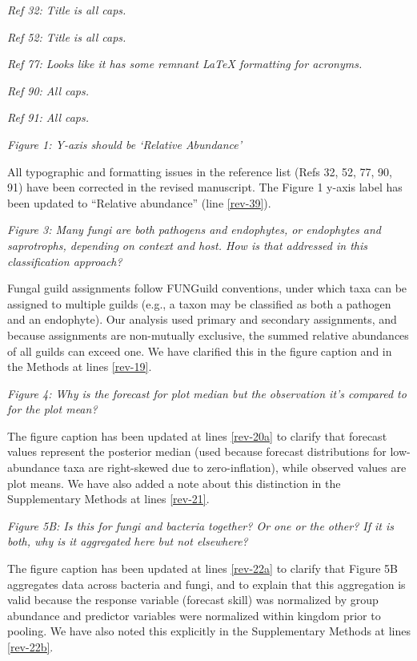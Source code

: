 \documentclass[11pt]{article}
\begin{document}
\bigskip

\textit{Ref 32: Title is all caps.}

\textit{Ref 52: Title is all caps.}

\textit{Ref 77: Looks like it has some remnant LaTeX formatting for acronyms.}

\textit{Ref 90: All caps.}

\textit{Ref 91: All caps.}

\textit{Figure 1: Y-axis should be `Relative Abundance'}

All typographic and formatting issues in the reference list (Refs 32, 52, 77, 90, 91) have been corrected in the revised manuscript. The Figure 1 y-axis label has been updated to ``Relative abundance'' (line \ref{rev-39}).

\bigskip

\textit{Figure 3: Many fungi are both pathogens and endophytes, or endophytes and saprotrophs, depending on context and host. How is that addressed in this classification approach?}

Fungal guild assignments follow FUNGuild conventions, under which taxa can be assigned to multiple guilds (e.g., a taxon may be classified as both a pathogen and an endophyte). Our analysis used primary and secondary assignments, and because assignments are non-mutually exclusive, the summed relative abundances of all guilds can exceed one. We have clarified this in the figure caption and in the Methods at lines \ref{rev-19}.

\bigskip

\textit{Figure 4: Why is the forecast for plot median but the observation it's compared to for the plot mean?}

The figure caption has been updated at lines \ref{rev-20a} to clarify that forecast values represent the posterior median (used because forecast distributions for low-abundance taxa are right-skewed due to zero-inflation), while observed values are plot means. We have also added a note about this distinction in the Supplementary Methods at lines \ref{rev-21}.

\bigskip

\textit{Figure 5B: Is this for fungi and bacteria together? Or one or the other? If it is both, why is it aggregated here but not elsewhere?}

The figure caption has been updated at lines \ref{rev-22a} to clarify that Figure 5B aggregates data across bacteria and fungi, and to explain that this aggregation is valid because the response variable (forecast skill) was normalized by group abundance and predictor variables were normalized within kingdom prior to pooling. We have also noted this explicitly in the Supplementary Methods at lines \ref{rev-22b}.
\end{document}
